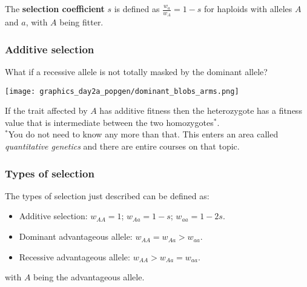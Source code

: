 \documentclass{beamer}
\newcommand{\1}{\ensuremath{\mathbf{1}}}
\begin{document}
%
%
%
\begin{frame}
	\begin{block}{}
		The \textbf{selection coefficient} $s$ is defined as $\tfrac{w_a}{w_A} = 1 - s$ for haploids with alleles $A$ and $a$, with $A$ being fitter.
	\end{block}
\end{frame}
%
%
%
\begin{frame}\frametitle{Additive selection}
	What if a recessive allele is not totally masked by the dominant allele?
	\begin{center}
		\texttt{[image: graphics\_day2a\_popgen/dominant\_blobs\_arms.png]}
	\end{center}
	If the trait affected by $A$ has additive fitness then the heterozygote has a fitness value that is intermediate between the two homozygotes$^{*}$.\\[2ex]
	{\scriptsize $^{*}$You do not need to know any more than that. This enters an area called \emph{quantitative genetics} and there are entire courses on that topic.}
\end{frame}
%
%
%
\begin{frame}\frametitle{Types of selection}
	The types of selection just described can be defined as:
	\begin{itemize}
		\item Additive selection: $w_{AA} = 1$; $w_{Aa} = 1-s$; $w_{aa} = 1-2s$.
		\item Dominant advantageous allele: $w_{AA} = w_{Aa} > w_{aa}$.
		\item Recessive advantageous allele: $w_{AA} > w_{Aa} = w_{aa}$.
	\end{itemize}
	with $A$ being the advantageous allele.
\end{frame}
\end{document}
